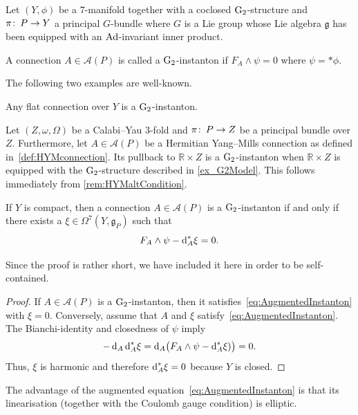 \documentclass[11pt,a4paper]{scrartcl}
\newcommand*\diff{\mathop{}\!\textup{d}}
\newcommand{\col}{\colon \thinspace}
\newcommand{\Ad}{\textup{Ad}}
\newcommand{\G}{\textup{G}}
\numberwithin{equation}{section}
\theoremstyle{plain}
\theoremstyle{definition}
\theoremstyle{remark}
\begin{document}
Let $(Y,\phi)$ be a $7$-manifold together with a coclosed $\G_2$-structure and $\pi \col P \to Y$ a principal $G$-bundle where $G$ is a Lie group whose Lie algebra $\mathfrak{g}$ has been equipped with an $\Ad$-invariant inner product.
\begin{definition}\label{def:G2-instanton}
A connection $A\in \mathcal{A}(P)$ is called a $\G_2$-instanton if $F_A \wedge \psi = 0$ where $\psi = *\phi$.
\end{definition}
The following two examples are well-known.
\begin{example}
Any flat connection over $Y$ is a $\G_2$-instanton.
\end{example}
\begin{example}\label{ex:HYM_is_G2-instanton}
Let $(Z,\omega,\Omega)$ be a Calabi--Yau $3$-fold and $\pi \col P \to Z$ be a principal bundle over $Z$. Furthermore, let $A \in \mathcal{A}(P)$ be a Hermitian Yang--Mills connection as defined in~\autoref{def:HYMconnection}. Its pullback to $\mathbb{R}\times Z$ is a $\G_2$-instanton when $\mathbb{R}\times Z$ is equipped with the $\G_2$-structure described in \autoref{ex_G2Model}. This follows immediately from \autoref{rem:HYMaltCondition}.
\end{example}
\begin{proposition}\label{prop:AugmentedInstanton}
If $Y$ is compact, then a connection $A\in \mathcal{A}(P)$ is a $\G_2$-instanton if and only if there exists a $\xi \in \Omega^7(Y,\mathfrak{g}_P)$ such that 
\begin{equation}\label{eq:AugmentedInstanton}
F_A \wedge \psi - \diff_A^* \xi = 0.
\end{equation}
\end{proposition}
Since the proof is rather short, we have included it here in order to be self-contained.
\begin{proof}
If $A\in \mathcal{A}(P)$ is a $\G_2$-instanton, then it satisfies~\eqref{eq:AugmentedInstanton} with $\xi=0$. Conversely, assume that $A$ and $\xi$ satisfy~\eqref{eq:AugmentedInstanton}. The Bianchi-identity and closedness of $\psi$ imply \[-\diff_A\diff_A^* \xi = \diff_A\big( F_A\wedge\psi-\diff_A^*\xi)\big) = 0.\] Thus, $\xi$ is harmonic and therefore $\diff_A^* \xi =0$ because $Y$ is closed.
\end{proof}
\begin{remark}
The advantage of the augmented equation~\eqref{eq:AugmentedInstanton} is that its linearisation (together with the Coulomb gauge condition) is elliptic.
\end{remark}
\end{document}
